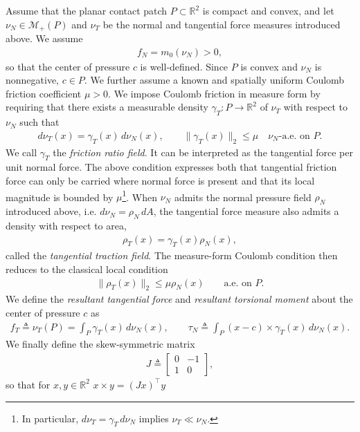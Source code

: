 \documentclass[11pt,a4paper]{article}
\theoremstyle{plain}
\begin{document}
Assume that the planar contact patch $P\subset\mathbb R^2$ is compact and convex,
and let $\nu_N\in\mathcal M_+(P)$ and $\nu_T$ be the normal and tangential force
measures introduced above. We assume
\begin{align}
f_N=m_0(\nu_N)>0,
\end{align}
so that the center of pressure $c$ is well-defined. Since $P$ is convex and
$\nu_N$ is nonnegative, $c\in P$.
We further assume a known and spatially uniform Coulomb friction coefficient
$\mu>0$.
We impose Coulomb friction in measure form by requiring that there exists a
measurable density $\gamma_T:P\rightarrow\mathbb R^2$ of $\nu_T$ with respect
to $\nu_N$ such that
\begin{align}
\label{eq:coulomb_measure}
d\nu_T(x)=\gamma_T(x)\,d\nu_N(x),
\qquad
\|\gamma_T(x)\|_2\le\mu
\quad \nu_N\text{-a.e. on }P.
\end{align}
We call $\gamma_T$ the \textit{friction ratio field}. It can be interpreted as
the tangential force per unit normal force. 
The above condition expresses both that tangential friction force can only be carried where normal force is present
and that its local magnitude is bounded by $\mu$\footnote{In particular, $d\nu_T=\gamma_T\,d\nu_N$ implies
$\nu_T\ll\nu_N$.}. When $\nu_N$ admits the normal pressure field $\rho_N$ introduced above, i.e. $d\nu_N=\rho_N\,dA$, the tangential force measure also admits a density with respect to area,
\begin{align}
\rho_T(x)=\gamma_T(x)\rho_N(x),
\end{align}
called the \textit{tangential traction field}. The measure-form Coulomb condition then reduces to the classical local condition
\begin{align}
\label{eq:coulomb_local}
\|\rho_T(x)\|_2\le\mu\rho_N(x)
\qquad \text{a.e. on }P.
\end{align}
We define the \textit{resultant tangential force} and \textit{resultant torsional moment} about the center of pressure $c$ as
\begin{align}
f_T \triangleq \nu_T(P)
= \int_P\gamma_T(x)\,d\nu_N(x),
\qquad
\tau_N \triangleq
\int_P (x-c)\times\gamma_T(x)\,d\nu_N(x).
\end{align}
We finally define the skew-symmetric matrix
\begin{align}
J \triangleq
\begin{bmatrix}
0&-1\\
1&0
\end{bmatrix},
\end{align}
so that for $x,y\in\mathbb R^2$ $x\times y=(Jx)^\top y$
\end{document}
